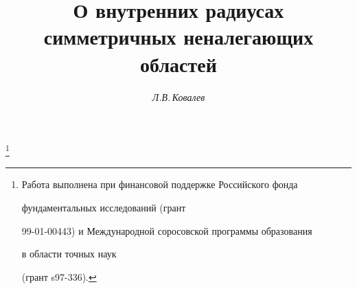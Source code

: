 




% 





\newcommand{\tts}[1]{}







\setcounter{page}{80}















\author{\it Л.В.\,Ковалев}




\title{О внутренних радиусах\\


симметричных неналегающих областей}


\thanks{Работа выполнена при финансовой поддержке Российского фонда


фундаментальных исследований (грант


99-01-00443) и Международной соросовской программы образования


в области точных наук %


(грант s97-336).}





\date{}




\pagestyle{plain} %





